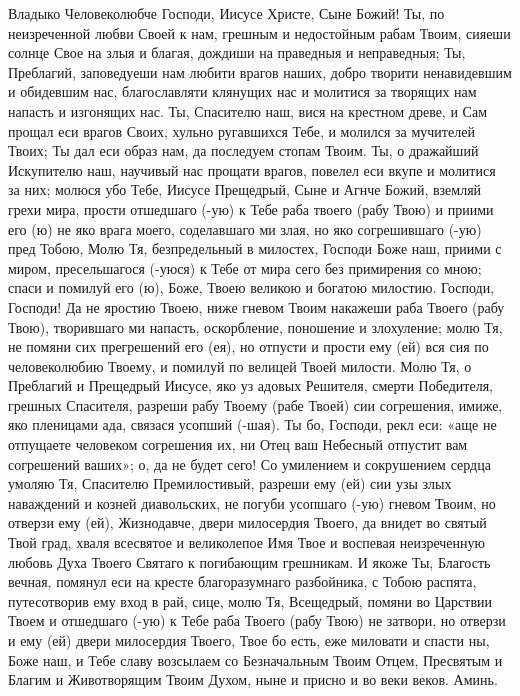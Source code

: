 \begin{mymulticols}

Владыко Человеколюбче Господи, Иисусе Христе, Сыне Божий! Ты, по неизреченной любви Своей к нам, грешным и недостойным рабам Твоим, сияеши солнце Свое на злыя и благая, дождиши на праведныя и неправедныя; Ты, Преблагий, заповедуеши нам любити врагов наших, добро творити ненавидевшим и обидевшим нас, благославляти клянущих нас и молитися за творящих нам напасть и изгонящих нас. Ты, Спасителю наш, вися на крестном древе, и Сам прощал еси врагов Своих, хульно ругавшихся Тебе, и молился за мучителей Твоих; Ты дал еси образ нам, да последуем стопам Твоим. Ты, о дражайший Искупителю наш, научивый нас прощати врагов, повелел еси вкупе и молитися за них; молюся убо Тебе, Иисусе Прещедрый, Сыне и Агнче Божий, вземляй грехи мира, прости отшедшаго (-ую) к Тебе раба твоего (рабу Твою)  и приими его (ю) не яко врага моего, соделавшаго ми злая, но яко согрешившаго (-ую) пред Тобою, Молю Тя, безпредельный в милостех, Господи Боже наш, приими с миром, пресельшагося (-уюся) к Тебе от мира сего без примирения со мною; спаси и помилуй его (ю), Боже, Твоею великою и богатою милостию. Господи, Господи! Да не яростию Твоею, ниже гневом Твоим накажеши раба Твоего (рабу Твою), творившаго ми напасть, оскорбление, поношение и злохуление; молю Тя, не помяни сих прегрешений его (ея), но отпусти и прости ему (ей) вся сия по человеколюбию Твоему, и помилуй по велицей Твоей милости. Молю Тя, о Преблагий и Прещедрый Иисусе, яко уз адовых Решителя, смерти Победителя, грешных Спасителя, разреши рабу Твоему (рабе Твоей) сии согрешения, имиже, яко пленицами ада, связася усопший (-шая). Ты бо, Господи, рекл еси: «аще не отпущаете человеком согрешения их, ни Отец ваш Небесный отпустит вам согрешений ваших»; о, да не будет сего! Со умилением и сокрушением сердца умоляю Тя, Спасителю Премилостивый, разреши ему (ей) сии узы злых наваждений и козней диавольских, не погуби усопшаго (-ую) гневом Твоим, но отверзи ему (ей), Жизнодавче, двери милосердия Твоего, да внидет во святый Твой град, хваля всесвятое и великолепое Имя Твое и воспевая неизреченную любовь Духа Твоего Святаго к погибающим грешникам. И якоже Ты, Благость вечная, помянул еси на кресте благоразумнаго разбойника, с Тобою распята, путесотворив ему вход в рай, сице, молю Тя, Всещедрый, помяни во Царствии Твоем и отшедшаго (-ую) к Тебе раба Твоего (рабу Твою)  не затвори, но отверзи и ему (ей) двери милосердия Твоего, Твое бо есть, еже миловати и спасти ны, Боже наш, и Тебе славу возсылаем со Безначальным Твоим Отцем, Пресвятым и Благим и Животворящим Твоим Духом, ныне и присно и во веки веков. Аминь. 

\end{mymulticols}

